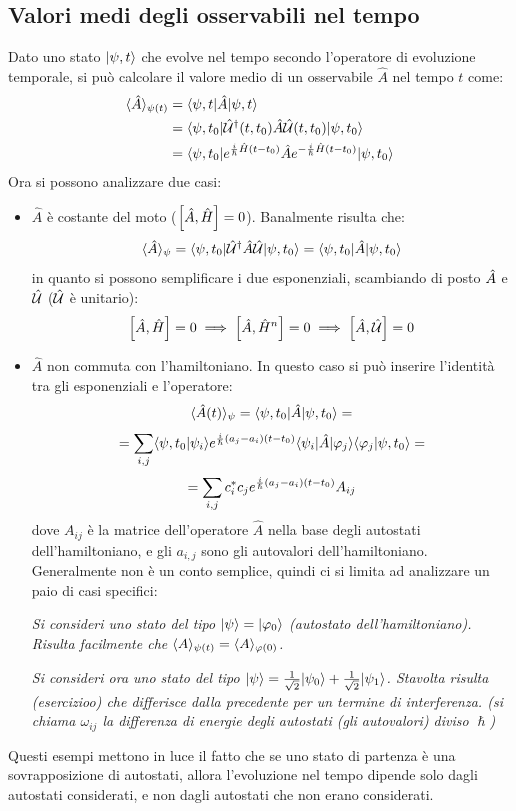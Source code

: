 \subsection{Valori medi degli osservabili nel tempo}
Dato uno stato $|\psi, t\rangle$ che evolve nel tempo secondo l'operatore di evoluzione temporale, si può calcolare il valore medio di un osservabile $\hat A$ nel tempo $t$ come:
\begin{align*}
    \langle \hat A \rangle_{\psi(t)} &= \langle \psi, t | \hat A | \psi, t \rangle \\
    &= \langle \psi, t_0 | \hat{\mathcal{U}}^\dag(t, t_0) \hat A \hat{\mathcal{U}}(t, t_0) | \psi, t_0 \rangle \\
    &= \langle \psi, t_0 | e^{\frac{i}{\hslash} \hat{H} (t - t_0)} \hat A e^{-\frac{i}{\hslash} \hat{H} (t - t_0)} | \psi, t_0 \rangle
\end{align*}
Ora si possono analizzare due casi:
\begin{itemize}
    \item $\hat A$ è costante del moto ($\left[\hat A, \hat H\right] = 0$). Banalmente risulta che:
    \[
        \langle \hat A\rangle_\psi = \langle \psi, t_0 | \hat{\mathcal{U}}^\dag \hat A \hat{\mathcal{U}} | \psi, t_0 \rangle = \langle \psi, t_0 | \hat A | \psi, t_0 \rangle
    \]
    in quanto si possono semplificare i due esponenziali, scambiando di posto $\hat A$ e $\hat{\mathcal{U}}$ ($\hat{\mathcal{U}}$ è unitario):
    \[\left[\hat A, \hat{H}\right] = 0 \implies \left[\hat A, \hat{H}^n\right] = 0 \implies \left[\hat A, \hat{\mathcal{U}}\right] = 0\]
    \item $\hat A$ non commuta con l'hamiltoniano. In questo caso si può inserire l'identità tra gli esponenziali e l'operatore:
    \[
        \langle \hat A(t) \rangle_\psi = \langle \psi, t_0 | \hat A | \psi, t_0 \rangle = \]\[
        = \sum_{i,j} \langle \psi, t_0|\psi_i\rangle e^{\frac{i}{\hslash} (a_j - a_i) (t - t_0)} \langle \psi_i | \hat A | \varphi_j\rangle \langle \varphi_j | \psi, t_0\rangle = \]\[
        = \sum_{i,j} c_i^* c_j e^{\frac{i}{\hslash} (a_j - a_i) (t - t_0)} A_{ij}
    \]
    dove $A_{ij}$ è la matrice dell'operatore $\hat A$ nella base degli autostati dell'hamiltoniano, e gli $a_{i,j}$ sono gli autovalori dell'hamiltoniano. Generalmente non è un conto semplice, quindi ci si limita ad analizzare un paio di casi specifici:

    \textit{Si consideri uno stato del tipo $| \psi \rangle = |\varphi_0\rangle$ (autostato dell'hamiltoniano). Risulta facilmente che $\langle A\rangle_{\psi(t)} = \langle A\rangle_{\varphi(0)}$.}

    \textit{Si consideri ora uno stato del tipo $| \psi \rangle = \frac{1}{\sqrt{2}}|\psi_0\rangle + \frac{1}{\sqrt{2}}|\psi_1\rangle$. Stavolta risulta (esercizioo) che differisce dalla precedente per un termine di interferenza. (si chiama $\omega_{ij}$ la differenza di energie degli autostati (gli autovalori) diviso $\hslash$)}
\end{itemize}
Questi esempi mettono in luce il fatto che se uno stato di partenza è una sovrapposizione di autostati, allora l'evoluzione nel tempo dipende solo dagli autostati considerati, e non dagli autostati che non erano considerati.

